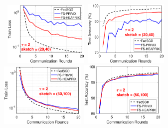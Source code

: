 \begin{figure}[h]
	\begin{center}
		\mbox{			    \includegraphics[width=1.6in]{MNIST_figures/local2_sketch20_iid1_train_loss.eps}
		\includegraphics[width=1.6in]{MNIST_figures/local2_sketch20_iid1_test_acc.eps}
		\includegraphics[width=1.6in]{MNIST_figures/local2_sketch50_iid1_train_loss.eps}
		\includegraphics[width=1.6in]{MNIST_figures/local2_sketch50_iid1_test_acc.eps}
		}
		

\end{center}
\end{figure}
